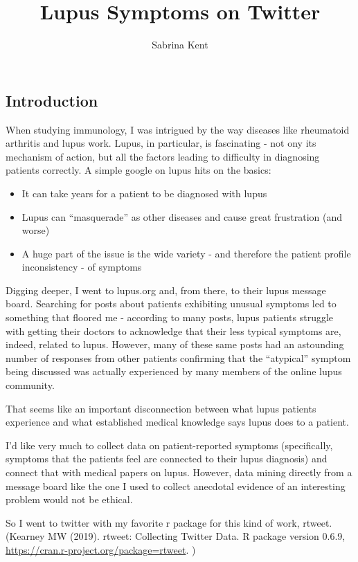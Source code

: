 \documentclass[]{article}
\title{Lupus Symptoms on Twitter}
\author{Sabrina Kent}
\date{}
\providecommand{\tightlist}{%
  \setlength{\itemsep}{0pt}\setlength{\parskip}{0pt}}
\begin{document}
\maketitle

\hypertarget{introduction}{%
\subsection{Introduction}\label{introduction}}

When studying immunology, I was intrigued by the way diseases like
rheumatoid arthritis and lupus work. Lupus, in particular, is
fascinating - not ony its mechanism of action, but all the factors
leading to difficulty in diagnosing patients correctly. A simple google
on lupus hits on the basics:

\begin{itemize}
\tightlist
\item
  It can take years for a patient to be diagnosed with lupus
\item
  Lupus can ``masquerade'' as other diseases and cause great frustration
  (and worse)
\item
  A huge part of the issue is the wide variety - and therefore the
  patient profile inconsistency - of symptoms
\end{itemize}

Digging deeper, I went to lupus.org and, from there, to their lupus
message board. Searching for posts about patients exhibiting unusual
symptoms led to something that floored me - according to many posts,
lupus patients struggle with getting their doctors to acknowledge that
their less typical symptoms are, indeed, related to lupus. However, many
of these same posts had an astounding number of responses from other
patients confirming that the ``atypical'' symptom being discussed was
actually experienced by many members of the online lupus community.

That seems like an important disconnection between what lupus patients
experience and what established medical knowledge says lupus does to a
patient.

I'd like very much to collect data on patient-reported symptoms
(specifically, symptoms that the patients feel are connected to their
lupus diagnosis) and connect that with medical papers on lupus. However,
data mining directly from a message board like the one I used to collect
anecdotal evidence of an interesting problem would not be ethical.

So I went to twitter with my favorite r package for this kind of work,
rtweet. (Kearney MW (2019). rtweet: Collecting Twitter Data. R package
version 0.6.9, \url{https://cran.r-project.org/package=rtweet}. )
\end{document}
